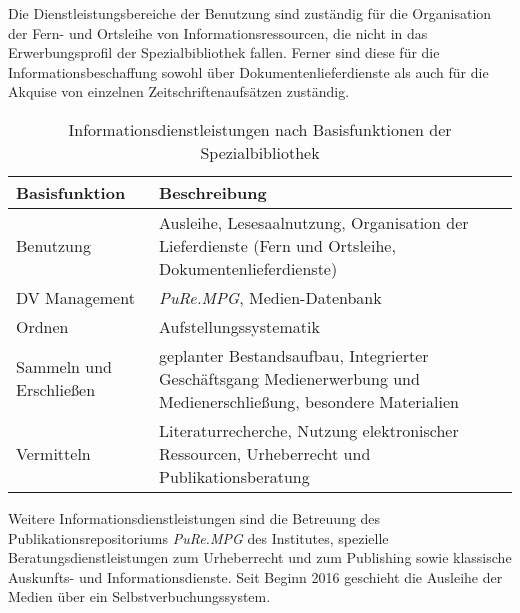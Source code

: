 Die Dienstleistungsbereiche der Benutzung sind zuständig für die Organisation der Fern- und Ortsleihe 
von Informationsressourcen, die nicht in das Erwerbungsprofil der Spezialbibliothek fallen. Ferner sind diese 
für die Informationsbeschaffung sowohl über Dokumentenlieferdienste als auch für die Akquise von einzelnen Zeitschriftenaufsätzen zuständig.

\begingroup
\setlength{\tabcolsep}{12pt} %
\renewcommand{\arraystretch}{1.5} 
\begin{table}[h]
    \centering
    \begin{adjustbox}{max width=\textwidth}
    \begin{tabular}{p{}p{}}
       \toprule
       \textbf{Basisfunktion}          & \textbf{Beschreibung}\\
       \midrule
        Benutzung                               &Ausleihe, Lesesaalnutzung, Organisation der Lieferdienste (Fern und Ortsleihe, Dokumentenlieferdienste)\\
        DV Management                           &\textit{\acrshort{PuRe.MPG}}, Medien-Datenbank\\
        Ordnen                                  &Aufstellungssystematik\\
        Sammeln und Erschließen                 &geplanter Bestandsaufbau, Integrierter Geschäftsgang Medienerwerbung und Medienerschließung, besondere Materialien\\
        Vermitteln                              &Literaturrecherche, Nutzung elektronischer Ressourcen, Urheberrecht und Publikationsberatung\\
   
       \bottomrule
    \end{tabular}
    \end{adjustbox}
    \caption{%
        Informationsdienstleistungen nach Basisfunktionen der Spezialbibliothek
    }
    \label{tab:Informationsdienstleistungen}
    \end{table}
\endgroup

Weitere Informationsdienstleistungen sind
die Betreuung des Publikationsrepositoriums \textit{\acrshort{PuRe.MPG}} des Institutes, spezielle Beratungsdienstleistungen 
zum Urheberrecht und zum Publishing sowie klassische Auskunfts- und Informationsdienste. Seit Beginn 2016 
geschieht die Ausleihe der Medien über ein Selbstverbuchungssystem.


